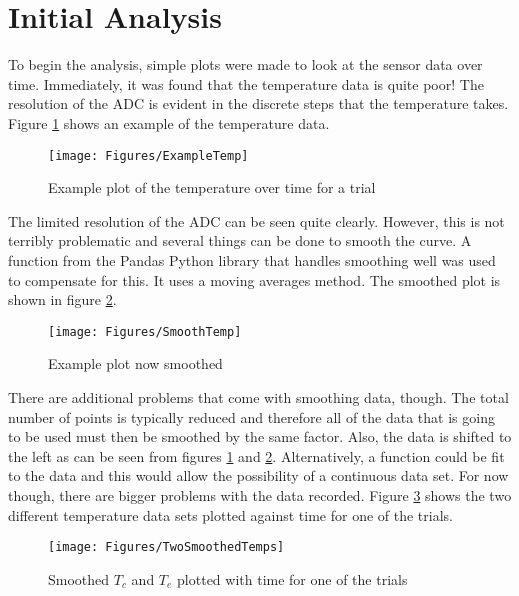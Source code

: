 \section{Initial Analysis}
To begin the analysis, simple plots were made to look at the sensor data over time. Immediately, it was found that the temperature data is quite poor! The resolution of the ADC is evident in the discrete steps that the temperature takes. Figure \ref{fig:BadTemp} shows an example of the temperature data.
\begin{figure}[h!]
\centering
\texttt{[image: Figures/ExampleTemp]}
\caption{Example plot of the temperature over time for a trial}
\label{fig:BadTemp}
\end{figure}
The limited resolution of the ADC can be seen quite clearly. However, this is not terribly problematic and several things can be done to smooth the curve. A function from the Pandas Python library that handles smoothing well was used to compensate for this. It uses a moving averages method. The smoothed plot is shown in figure \ref{fig:SmoothedTemp}.
\begin{figure}[h!]
\centering
\texttt{[image: Figures/SmoothTemp]}
\caption{Example plot now smoothed}
\label{fig:SmoothedTemp}
\end{figure}
There are additional problems that come with smoothing data, though. The total number of points is typically reduced and therefore all of the data that is going to be used must then be smoothed by the same factor. Also, the data is shifted to the left as can be seen from figures \ref{fig:BadTemp} and \ref{fig:SmoothedTemp}. Alternatively, a function could be fit to the data and this would allow the possibility of a continuous data set. For now though, there are bigger problems with the data recorded. Figure \ref{fig:BothTemps} shows the two different temperature data sets plotted against time for one of the trials. 
\begin{figure}[h!]
\centering
\texttt{[image: Figures/TwoSmoothedTemps]}
\caption{Smoothed $T_c$ and $T_e$ plotted with time for one of the trials}
\label{fig:BothTemps}
\end{figure}
